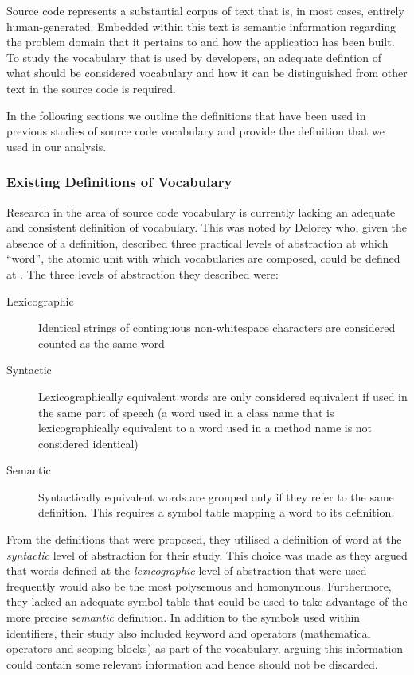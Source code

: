 Source code represents a substantial corpus of text that is, in most cases, entirely human-generated. Embedded within this text is semantic information regarding the problem domain that it pertains to and how the application has been built. To study the vocabulary that is used by developers, an adequate defintion of what should be considered vocabulary and how it can be distinguished from other text in the source code is required.

In the following sections we outline the definitions that have been used in previous studies of source code vocabulary and provide the definition that we used in our analysis.

\subsubsection{Existing Definitions of Vocabulary} %
\label{ssub:existing_definitions_of_vocabulary}

Research in the area of source code vocabulary is currently lacking an adequate and consistent definition of vocabulary. This was noted by Delorey \etal who, given the absence of a definition, described three practical levels of abstraction at which ``word'', the atomic unit with which vocabularies are composed, could be defined at \cite{Delorey09a}. The three levels of abstraction they described were:

\begin{description}
	\item[Lexicographic] Identical strings of continguous non-whitespace characters are considered counted as the same word
	\item[Syntactic] Lexicographically equivalent words are only considered equivalent if used in the same part of speech (\eg a word used in a class name that is lexicographically equivalent to a word used in a method name is not considered identical)
	\item[Semantic] Syntactically equivalent words are grouped only if they refer to the same definition. This requires a symbol table mapping a word to its definition.
\end{description}

From the definitions that were proposed, they utilised a definition of word at the \emph{syntactic} level of abstraction for their study. This choice was made as they argued that words defined at the \emph{lexicographic} level of abstraction that were used frequently would also be the most polysemous and homonymous. Furthermore, they lacked an adequate symbol table that could be used to take advantage of the more precise \emph{semantic} definition. In addition to the symbols used within identifiers, their study also included keyword and operators (\eg mathematical operators and scoping blocks) as part of the vocabulary, arguing this information could contain some relevant information and hence should not be discarded.

